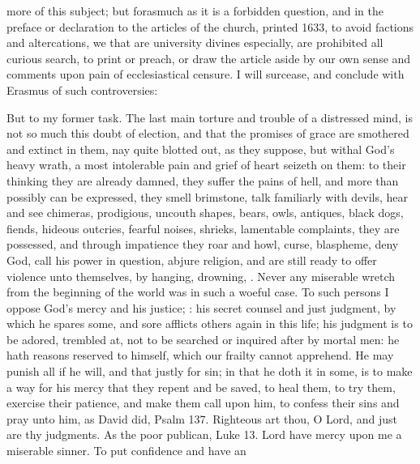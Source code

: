 {more of this subject; but forasmuch as it is a forbidden question, and
in the preface or declaration to the articles of the church, printed
1633, to avoid factions and altercations, we that are university
divines especially, are prohibited all curious search, to print or
preach, or draw the article aside by our own sense and comments upon
pain of ecclesiastical censure. I will surcease, and conclude with
Erasmus of such controversies: 

But to my former task. The last main torture and trouble of a
distressed mind, is not so much this doubt of election, and that the
promises of grace are smothered and extinct in them, nay quite blotted
out, as they suppose, but withal God's heavy wrath, a most intolerable
pain and grief of heart seizeth on them: to their thinking they are
already damned, they suffer the pains of hell, and more than possibly
can be expressed, they smell brimstone, talk familiarly with devils,
hear and see chimeras, prodigious, uncouth shapes, bears, owls,
antiques, black dogs, fiends, hideous outcries, fearful noises,
shrieks, lamentable complaints, they are possessed, and through
impatience they roar and howl, curse, blaspheme, deny God, call his
power in question, abjure religion, and are still ready to offer
violence unto themselves, by hanging, drowning, \etc{}. Never any miserable
wretch from the beginning of the world was in such a woeful case. To
such persons I oppose God's mercy and his justice; : his secret counsel and just judgment, by which he spares
some, and sore afflicts others again in this life; his judgment is to
be adored, trembled at, not to be searched or inquired after by mortal
men: he hath reasons reserved to himself, which our frailty cannot
apprehend. He may punish all if he will, and that justly for sin; in
that he doth it in some, is to make a way for his mercy that they
repent and be saved, to heal them, to try them, exercise their
patience, and make them call upon him, to confess their sins and pray
unto him, as David did, Psalm  137. Righteous art thou, O Lord,
and just are thy judgments. As the poor publican, Luke  13. Lord
have mercy upon me a miserable sinner. To put confidence and have an
}
